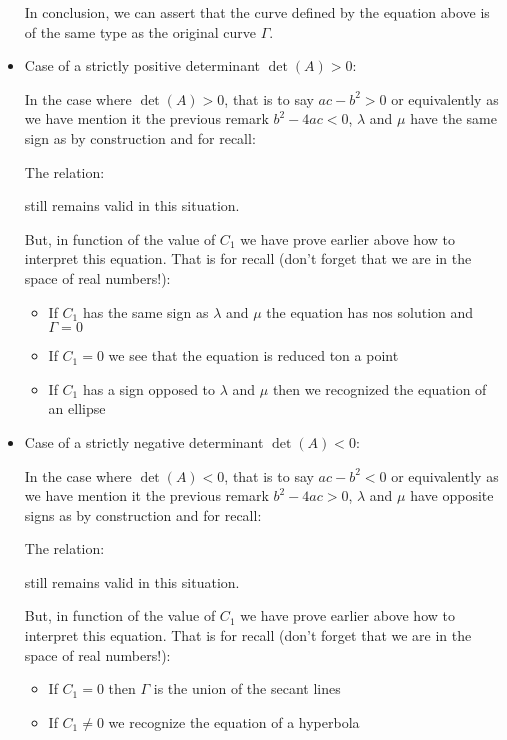\begin{itemize}
	In conclusion, we can assert that the curve defined by the equation above is of the same type as the original curve $\Gamma$.

		\item Case of a strictly positive determinant $\det(A)>0$:
		
		In the case where $\det(A)>0$, that is to say $ac-b^2>0$ or equivalently as we have mention it the previous remark $b^2-4ac<0$, $\lambda$ and $\mu$ have the same sign as by construction and for recall:
		
		The relation:
		
		still remains valid in this situation.
	
		But, in function of the value of $C_1$ we have prove earlier above how to interpret this equation. That is for recall (don't forget that we are in the space of real numbers!):
		\begin{itemize}
			\item If $C_1$ has the same sign as $\lambda$ and $\mu$ the equation has nos solution and $\Gamma=0$
	
			\item If $C_1=0$ we see that the equation is reduced ton a point
	
			\item If $C_1$ has a sign opposed to $\lambda$ and $\mu$ then we recognized the equation of an ellipse
		\end{itemize}

		\item Case of a strictly negative determinant $\det(A)<0$:
		
		In the case where $\det(A)<0$, that is to say $ac-b^2<0$ or equivalently as we have mention it the previous remark $b^2-4ac>0$, $\lambda$ and $\mu$ have opposite signs as by construction and for recall:
		
		The relation:
		
		still remains valid in this situation.

		But, in function of the value of $C_1$ we have prove earlier above how to interpret this equation. That is for recall (don't forget that we are in the space of real numbers!):
		\begin{itemize}
			\item If $C_1=0$ then $\Gamma$ is the union of the secant lines
	
			\item If $C_1\neq 0$ we recognize the equation of a hyperbola
		\end{itemize}


\end{itemize}
